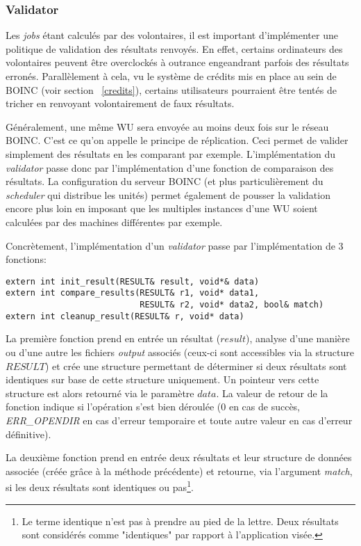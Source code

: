 \documentclass[a4paper, 12pt]{report}
\begin{document}
\subsubsection{Validator}
Les \textit{jobs} étant calculés par des volontaires, il est important d'implémenter une politique de validation des résultats renvoyés. En effet, certains ordinateurs des volontaires peuvent être overclockés à outrance engeandrant parfois des résultats erronés. Parallèlement à cela, vu le système de crédits mis en place au sein de \textsc{BOINC} (voir section ~\ref{credits}), certains utilisateurs pourraient être tentés de tricher en renvoyant volontairement de faux résultats. 

Généralement, une même WU sera envoyée au moins deux fois sur le réseau \textsc{BOINC}. C'est ce qu'on appelle le principe de réplication. Ceci permet de valider simplement des résultats en les comparant par exemple. L'implémentation du \textit{validator} passe donc par l'implémentation d'une fonction de comparaison des résultats. La configuration du serveur \textsc{BOINC} (et plus particulièrement du \textit{scheduler} qui distribue les unités) permet également de pousser la validation encore plus loin en imposant que les multiples instances d'une WU soient calculées par des machines différentes par exemple.

Concrètement, l'implémentation d'un \textit{validator} passe par l'implémentation de 3 fonctions:
\begin{verbatim}
extern int init_result(RESULT& result, void*& data)
extern int compare_results(RESULT& r1, void* data1, 
                           RESULT& r2, void* data2, bool& match)
extern int cleanup_result(RESULT& r, void* data)
\end{verbatim}

La première fonction prend en entrée un résultat ($result$), analyse d'une manière ou d'une autre les fichiers \textit{output} associés (ceux-ci sont accessibles via la structure $RESULT$) et crée une structure permettant de déterminer si deux résultats sont identiques sur base de cette structure uniquement. Un pointeur vers cette structure est alors retourné via le paramètre $data$. La valeur de retour de la fonction indique si l'opération s'est bien déroulée (0 en cas de succès, \textit{ERR\_OPENDIR} en cas d'erreur temporaire et toute autre valeur en cas d'erreur définitive).

La deuxième fonction prend en entrée deux résultats et leur structure de données associée (créée grâce à la méthode précédente) et retourne, via l'argument \textit{match}, si les deux résultats sont identiques ou pas\footnote{Le terme identique n'est pas à prendre au pied de la lettre. Deux résultats sont considérés comme "identiques" par rapport à l'application visée.}.
\end{document}
